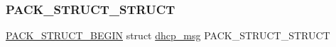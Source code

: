\subsubsection{\texorpdfstring{P\+A\+C\+K\+\_\+\+S\+T\+R\+U\+C\+T\+\_\+\+S\+T\+R\+U\+CT}{PACK\_STRUCT\_STRUCT}}
{\footnotesize\ttfamily \hyperlink{group__compiler__abstraction_ga73199061891adf1b912d20835c7d5e96}{P\+A\+C\+K\+\_\+\+S\+T\+R\+U\+C\+T\+\_\+\+B\+E\+G\+IN} struct \hyperlink{structdhcp__msg}{dhcp\+\_\+msg}  P\+A\+C\+K\+\_\+\+S\+T\+R\+U\+C\+T\+\_\+\+S\+T\+R\+U\+CT}

